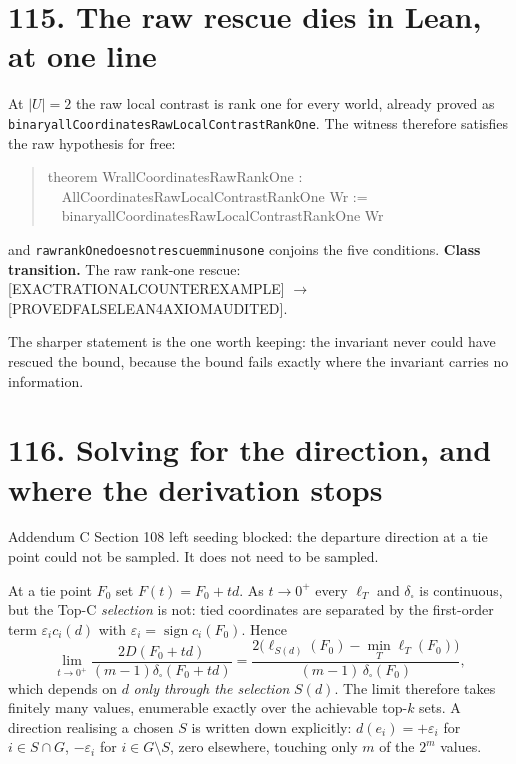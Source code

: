 \documentclass[9pt,twocolumn]{article}
\newcommand{\eclass}[1]{\textsf{[#1]}}
\renewcommand{\_}{\CIGunderscore\allowbreak}
\begin{document}
\section*{115. The raw rescue dies in Lean, at one line}
At $|U|=2$ the raw local contrast is rank one for every world, already proved as \texttt{binary\_allCoordinatesRawLocalContrastRankOne}. The witness therefore satisfies the raw hypothesis for free:
\begin{quote}\ttfamily\scriptsize
theorem Wr\_allCoordinatesRawRankOne :\\
\ \ AllCoordinatesRawLocalContrastRankOne Wr :=\\
\ \ binary\_allCoordinatesRawLocalContrastRankOne Wr
\end{quote}
and \texttt{raw\_rankOne\_does\_not\_rescue\_m\_minus\_one} conjoins the five conditions. \textbf{Class transition.} The raw rank-one rescue: \eclass{EXACT\_RATIONAL\_COUNTEREXAMPLE} $\longrightarrow$ \eclass{PROVED\_FALSE\_LEAN4\_AXIOM\_AUDITED}.

The sharper statement is the one worth keeping: the invariant never could have rescued the bound, because the bound fails exactly where the invariant carries no information.

\section*{116. Solving for the direction, and where the derivation stops}
Addendum C Section 108 left seeding blocked: the departure direction at a tie point could not be sampled. It does not need to be sampled.

At a tie point $F_0$ set $F(t)=F_0+td$. As $t\to0^+$ every $\ell_T$ and $\delta_{\square}$ is continuous, but the Top-C \emph{selection} is not: tied coordinates are separated by the first-order term $\varepsilon_ic_i(d)$ with $\varepsilon_i=\operatorname{sign}c_i(F_0)$. Hence
\[
\lim_{t\to0^+}\frac{2D(F_0+td)}{(m-1)\delta_{\square}(F_0+td)}
=\frac{2\bigl(\ell_{S(d)}(F_0)-\min_T\ell_T(F_0)\bigr)}{(m-1)\,\delta_{\square}(F_0)},
\]
which depends on $d$ \emph{only through the selection} $S(d)$. The limit therefore takes finitely many values, enumerable exactly over the achievable top-$k$ sets. A direction realising a chosen $S$ is written down explicitly: $d(e_i)=+\varepsilon_i$ for $i\in S\cap G$, $-\varepsilon_i$ for $i\in G\setminus S$, zero elsewhere, touching only $m$ of the $2^m$ values.
\end{document}
